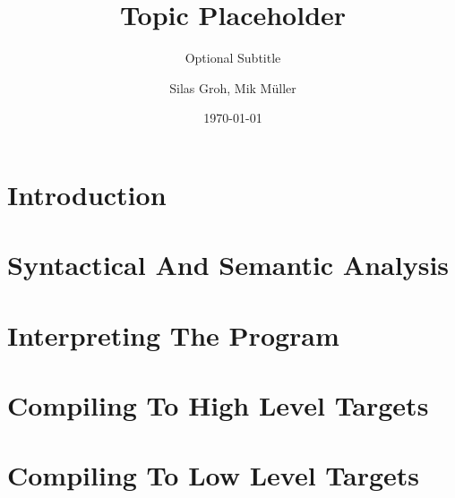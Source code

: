 



% 
% 

\titlehead{\centering\texttt{[image: pictures/title.png]}}
\title{Topic Placeholder}
\subtitle{Optional Subtitle}
\author{Silas Groh, Mik Müller}
\publishers{Carl Fuhlrott Gymnasium}
\date{\today}


\maketitle

\tableofcontents

\chapter{Introduction}



\chapter{Syntactical And Semantic Analysis}



\chapter{Interpreting The Program}



\chapter{Compiling To High Level Targets}



\chapter{Compiling To Low Level Targets}





%

\listoffigures
\listoftables
{}
\nocite{*}
\printbibliography[heading=bibintoc]

